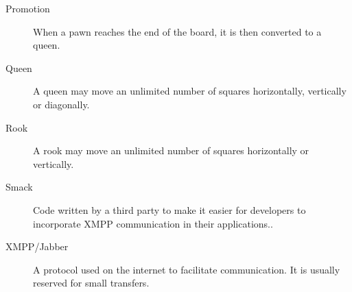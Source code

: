\begin{description}
\item[Promotion] When a pawn reaches the end of the board, it is then converted to a queen.
\item[Queen] A queen may move an unlimited number of squares horizontally, vertically or diagonally.
\item[Rook] A rook may move an unlimited number of squares horizontally or vertically.
\item[Smack] Code written by a third party to make it easier for developers to incorporate XMPP communication in their applications..
\item[XMPP/Jabber] A protocol used on the internet to facilitate communication. It is usually reserved for small transfers.
\end{description}

